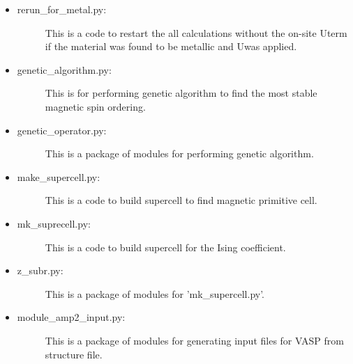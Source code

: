 \documentclass[letterpaper,10pt,english]{sphinxmanual}
\begin{document}
\begin{itemize}
\item {} \begin{description}
\item[{rerun\_for\_metal.py:}] \leavevmode
This is a code to restart the all calculations without the on-site Uterm if the material was found to be metallic and Uwas applied.

\end{description}

\item {} \begin{description}
\item[{genetic\_algorithm.py:}] \leavevmode
This is for performing genetic algorithm to find the most stable magnetic
spin ordering.

\end{description}

\item {} \begin{description}
\item[{genetic\_operator.py:}] \leavevmode
This is a package of modules for performing genetic algorithm.

\end{description}

\item {} \begin{description}
\item[{make\_supercell.py:}] \leavevmode
This is a code to build supercell to find magnetic primitive cell.

\end{description}

\item {} \begin{description}
\item[{mk\_suprecell.py:}] \leavevmode
This is a code to build supercell for the Ising coefficient.

\end{description}

\item {} \begin{description}
\item[{z\_subr.py:}] \leavevmode
This is a package of modules for ’mk\_supercell.py’.

\end{description}

\item {} \begin{description}
\item[{module\_amp2\_input.py:}] \leavevmode
This is a package of modules for generating input files for VASP from structure file.


\end{description}
\end{itemize}
\end{document}
